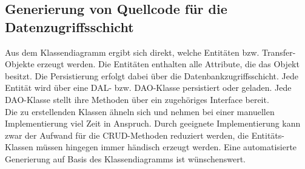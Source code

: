\documentclass[a4paper,12pt]{scrreprt}
\begin{document}
\subsection{Generierung von Quellcode für die Datenzugriffsschicht}
\label{sub:gen_dao}
Aus dem Klassendiagramm ergibt sich direkt, welche Entitäten bzw. Transfer-Objekte erzeugt werden. Die Entitäten enthalten alle Attribute, die das Objekt besitzt. Die Persistierung erfolgt dabei über die Datenbankzugriffsschicht. Jede Entität wird über eine DAL- bzw. DAO-Klasse \cite{daoPattern} persistiert oder geladen. Jede DAO-Klasse stellt ihre Methoden über ein zugehöriges Interface bereit.
\\
Die zu erstellenden Klassen ähneln sich und nehmen bei einer manuellen Implementierung viel Zeit in Anspruch. Durch geeignete Implementierung kann zwar der Aufwand für die CRUD-Methoden reduziert werden, die Entitäts-Klassen müssen hingegen immer händisch erzeugt werden. Eine automatisierte Ge\-ne\-rie\-rung auf Basis des Klassendiagramms ist wünschenswert.
\end{document}
